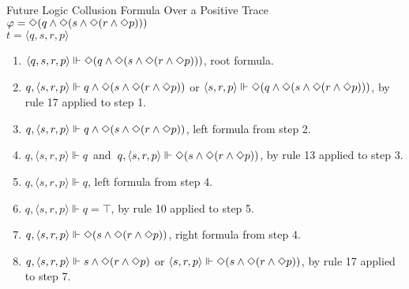 \begin{myEx} Future Logic Collusion Formula Over a Positive Trace\\

$\varphi = \Diamond(q \land \Diamond(s \land \Diamond(r \land \Diamond p)))$\\
\indent $t = \langle q, s, r, p \rangle$\\

\begin{enumerate}
\item $\langle q,s,r,p \rangle \Vdash \Diamond(q \land \Diamond(s \land \Diamond(r \land \Diamond p)))$, root formula.\\ %

\item $q, \langle s,r,p \rangle \Vdash q \land \Diamond(s \land \Diamond(r \land \Diamond p))$ or $\langle s,r,p \rangle \Vdash \Diamond(q \land \Diamond(s \land \Diamond(r \land \Diamond p)))$, by rule 17 applied to step 1.\\ %

\item $q , \langle s,r,p \rangle \Vdash q \land \Diamond(s \land \Diamond(r \land \Diamond p))$, left formula from step 2.\\ %

\item $q , \langle s,r,p \rangle \Vdash q$\ and\ $q , \langle s,r,p \rangle \Vdash \Diamond(s \land \Diamond(r \land \Diamond p))$, by rule 13 applied to step 3.\\ %

\item $q , \langle s,r,p \rangle \Vdash q$, left formula from step 4.\\ %

\item $q , \langle s,r,p \rangle \Vdash q = \top$, by rule 10 applied to step 5.\\ %

\item $q, \langle s,r,p \rangle \Vdash \Diamond(s \land \Diamond(r \land \Diamond p))$, right formula from step 4.\\ %

\item $q, \langle s,r,p \rangle \Vdash s \land \Diamond(r \land \Diamond p)$ or $\langle s,r,p \rangle \Vdash \Diamond(s \land \Diamond(r \land \Diamond p))$, by rule 17 applied to step 7.\\ %


\end{enumerate}
\end{myEx}
